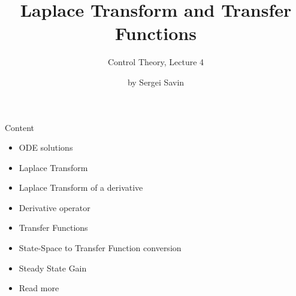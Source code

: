 \documentclass{beamer}
\title{Laplace Transform and Transfer Functions}
\subtitle{Control Theory, Lecture 4}
\author{by Sergei Savin}
\date{\mydate}
\begin{document}
\maketitle


\begin{frame}{Content}

\begin{itemize}
\item ODE solutions
\item Laplace Transform
\item Laplace Transform of a derivative
\item Derivative operator
\item Transfer Functions
\item State-Space to Transfer Function conversion
\item Steady State Gain
\item Read more
\end{itemize}

\end{frame}




%
%
%
%
\end{document}
